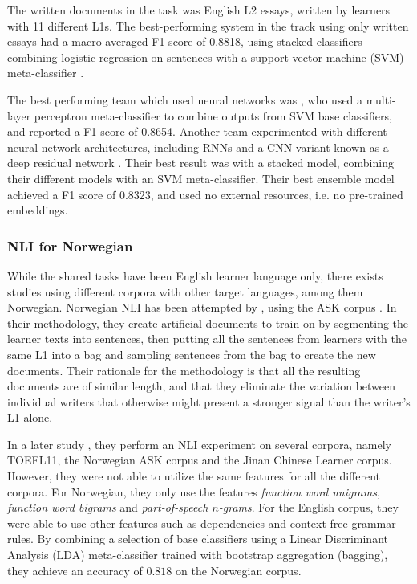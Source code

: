 The written documents in the task was English L2 essays, written by learners
with 11 different L1s. The best-performing system in the track using only
written essays had a macro-averaged F1 score of 0.8818, using stacked
classifiers combining logistic regression on sentences with a support vector
machine (SVM) meta-classifier \autocite{cimino17}.

The best performing team which used neural networks was \textcite{li17}, who
used a multi-layer perceptron meta-classifier to combine outputs from SVM
base classifiers, and reported a F1 score of 0.8654. Another team
experimented with different neural network architectures, including RNNs and
a CNN variant known as a deep residual network \autocite{bjerva2017neural}.
Their best result was with a stacked model, combining their different models
with an SVM meta-classifier. Their best ensemble model achieved a F1 score of
0.8323, and used no external resources, i.e. no pre-trained embeddings.


\subsubsection{NLI for Norwegian}

While the shared tasks have been English learner language only, there exists
studies using different corpora with other target languages, among them
Norwegian. Norwegian NLI has been attempted by \textcite{malmasi15}, using
the ASK corpus \autocite{tenfjord06}. In their methodology, they create
artificial documents to train on by segmenting the learner texts into
sentences, then putting all the sentences from learners with the same L1 into
a bag and sampling sentences from the bag to create the new documents. Their
rationale for the methodology is that all the resulting documents are of
similar length, and that they eliminate the variation between individual
writers that otherwise might present a stronger signal than the writer's L1
alone.

In a later study \autocite{malmasi17}, they perform an NLI experiment on
several corpora, namely TOEFL11, the Norwegian ASK corpus and the Jinan
Chinese Learner corpus. However, they were not able to utilize the same
features for all the different corpora. For Norwegian, they only use the
features \emph{function word unigrams}, \emph{function word bigrams} and
\emph{part-of-speech $n$-grams}. For the English corpus, they were able to
use other features such as dependencies and context free grammar-rules. By
combining a selection of base classifiers using a Linear Discriminant
Analysis (LDA) meta-classifier trained with bootstrap aggregation (bagging),
they achieve an accuracy of $0.818$ on the Norwegian corpus.

